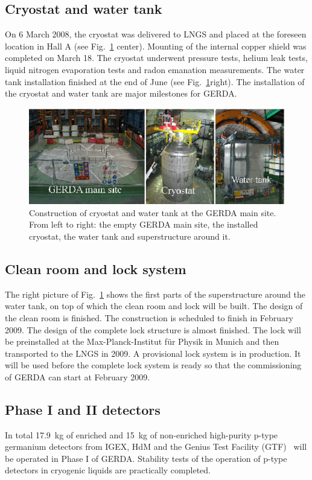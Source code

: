 \subsection{Cryostat and water tank}
\label{sec:gerda:stat1}
On 6 March 2008, the cryostat was delivered to LNGS and placed at the foreseen location in Hall A (see Fig.~\ref{fig:cryo} center). Mounting of the internal copper shield was completed on March 18. The cryostat underwent pressure tests, helium leak tests, liquid nitrogen evaporation tests and radon emanation measurements. The water tank installation finished at the end of June (see Fig.~\ref{fig:cryo}right). The installation of the cryostat and water tank are major milestones for GERDA.

\begin{figure}[tbhp]
  \centering
  \includegraphics[width=\textwidth]{cryostat}
  \caption{Construction of cryostat and water tank at the GERDA main     site.  From left to right: the empty GERDA main site, the     installed cryostat, the water tank and superstructure around it.}
  \label{fig:cryo}
\end{figure}

\subsection{Clean room and lock system}
\label{sec:gerda:stat2}
The right picture of Fig.~\ref{fig:cryo} shows the first parts of the superstructure around the water tank, on top of which the clean room and lock will be built. The design of the clean room is finished. The construction is scheduled to finish in February 2009. The design of the complete lock structure is almost finished. The lock will be preinstalled at the Max-Planck-Institut f\"ur Physik in Munich and then transported to the LNGS in 2009. A provisional lock system is in production. It will be used before the complete lock system is ready so that the commissioning of GERDA can start at February 2009.

\subsection{Phase I and II detectors}
\label{sec:gerda:stat3}
In total 17.9~kg of enriched and 15~kg of non-enriched high-purity p-type germanium detectors from IGEX, HdM and the Genius Test Facility (GTF)~\cite{Kla02} will be operated in Phase I of GERDA. Stability tests of the operation of p-type detectors in cryogenic liquids are practically completed. 

